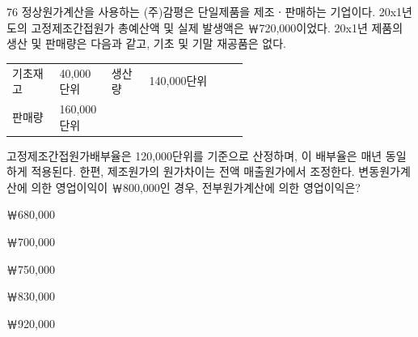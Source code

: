 \begin{question}{76}
정상원가계산을 사용하는 (주)감평은 단일제품을 제조ㆍ판매하는 기업이다. 20x1년도의 고정제조간접원가 총예산액 및 실제 발생액은 ￦720,000이었다. 20x1년 제품의 생산 및 판매량은 다음과 같고, 기초 및 기말 재공품은 없다.
\begin{framedtext}
\begin{tabular}{@{}p{0.2\linewidth}p{0.22\linewidth}p{0.16\linewidth}l@{}}
기초재고 & 40,000단위 & 생산량 & 140,000단위 \\
판매량 & 160,000단위 & & \\
\end{tabular}
\end{framedtext}
고정제조간접원가배부율은 120,000단위를 기준으로 산정하며, 이 배부율은 매년 동일하게 적용된다. 한편, 제조원가의 원가차이는 전액 매출원가에서 조정한다. 변동원가계산에 의한 영업이익이 ￦800,000인 경우, 전부원가계산에 의한 영업이익은? \par
\begin{choices}
  \item ￦680,000
  \item ￦700,000
  \item ￦750,000
  \item ￦830,000
  \item ￦920,000
\end{choices}
\end{question}
